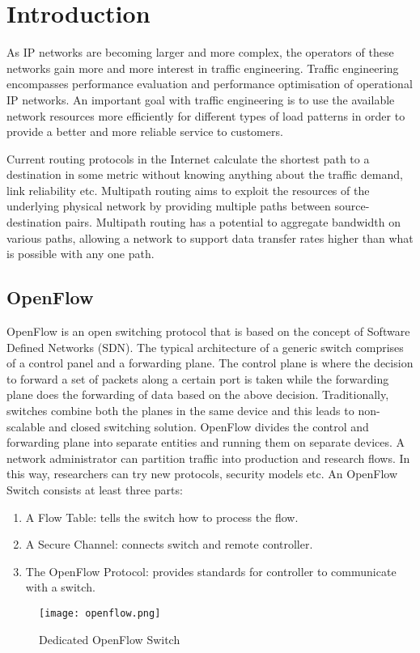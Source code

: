 \documentclass[12pt,a4paper]{article}
\begin{document}
\tableofcontents
\newpage
\listoffigures

\newpage


\section{Introduction}
As IP networks are becoming larger and more complex, the operators of these networks
gain more and more interest in traffic engineering. Traffic engineering encompasses
performance evaluation and performance optimisation of operational IP networks. An
important goal with traffic engineering is to use the available network resources more
efficiently for different types of load patterns in order to provide a better and more reliable
service to customers.


Current routing protocols in the Internet calculate the shortest path to a destination in
some metric without knowing anything about the traffic demand, link reliability etc.
Multipath routing aims to exploit the resources of the underlying physical network by
providing multiple paths between source-destination pairs. Multipath routing has a potential
to aggregate bandwidth on various paths, allowing a network to support data transfer rates
higher than what is possible with any one path.

\subsection{OpenFlow}
OpenFlow \cite{openflow} is an open switching protocol that is based on the concept of Software Defined
Networks (SDN). The typical architecture of a generic switch comprises of a control panel
and a forwarding plane. The control plane is where the decision to forward a set of packets
along a certain port is taken while the forwarding plane does the forwarding of data based on
the above decision. Traditionally, switches combine both the planes in the same device and
this leads to non-scalable and closed switching solution. OpenFlow divides the control and
forwarding plane into separate entities and running them on separate devices. A network
administrator can partition traffic into production and research flows. In this way, researchers
can try new protocols, security models etc.
An OpenFlow Switch consists at least three parts:

\begin{enumerate}




\item A Flow Table: tells the switch how to process the flow.
\item A Secure Channel: connects switch and remote controller.
\item The OpenFlow Protocol: provides standards for controller
to communicate with a switch.
\end{enumerate}
\begin{figure}[H]
\begin{center}


\texttt{[image: openflow.png]}
\end{center}
\caption{Dedicated OpenFlow Switch}
\end{figure}
\end{document}
